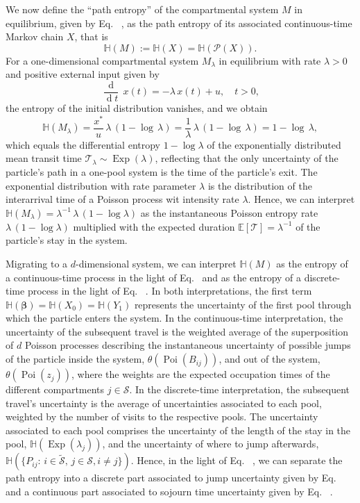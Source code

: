 \documentclass[smallextended]{svjour3}
\makeatletter
\renewcommand*{\eqref}[1]{%
  \hyperref[{#1}]{\textup{\tagform@{\ref*{#1}}}}%
}
\renewcommand{\vec}[1]{\mathbf{#1}}
\newcommand{\E}{\mathbb{E}}
\newcommand{\TT}{\mathcal{T}}
\renewcommand{\H}{\mathbb{H}}
\newcommand{\Exp}{\operatorname{Exp}}
\newcommand{\Poi}{\operatorname{Poi}}
\newcommand{\deriv}[1]{\frac{\operatorname{d}}{\operatorname{d}#1}}
\newcommand{\ie}{that is}
\renewcommand{\emph}[1]{``#1''}
\makeatother
\begin{document}
We now define the \emph{path entropy} of the compartmental system $M$ in equilibrium, given by Eq.~\eqref{eqn:lin_CS_sys}, as the path entropy of its associated continuous-time Markov chain $X$, \ie
\begin{equation}
  \H(M):=\H(X)=\H(\mathcal{P}(X)).
\end{equation}
For a one-dimensional compartmental system $M_\lambda$ in equilibrium with rate $\lambda>0$ and positive external input given by
\begin{equation}
  \deriv{t}\,x(t) = -\lambda\,x(t) + u,\quad t>0,
\end{equation}
the entropy of the initial distribution vanishes, and we obtain
\begin{equation}
  \H(M_\lambda) = \frac{x^\ast}{u}\,\lambda\,(1-\log\,\lambda) = \frac{1}{\lambda}\,\lambda\,(1-\log\,\lambda) = 1-\log\,\lambda,
\end{equation}  
which equals the differential entropy $1-\log\lambda$ of the exponentially distributed mean transit time $\TT_\lambda\sim\Exp(\lambda)$, reflecting that the only uncertainty of the particle's path in a one-pool system is the time of the particle's exit.
The exponential distribution with rate parameter $\lambda$ is the distribution of the interarrival time of a Poisson process wit intensity rate $\lambda$.
Hence, we can interpret $\H(M_\lambda) = \lambda^{-1}\,\lambda\,(1-\log\lambda)$ as the instantaneous Poisson entropy rate $\lambda\,(1-\log\lambda)$ multiplied with the expected duration $\E\left[\TT\right]=\lambda^{-1}$ of the particle's stay in the system.

Migrating to a $d$-dimensional system, we can interpret $\H(M)$ as the entropy of a continuous-time process in the light of Eq.~\eqref{eqn:H_occupation_time} and as the entropy of a discrete-time process in the light of Eq.~\eqref{eqn:H_number_of_visits}.
In both interpretations, the first term $\H(\vec{\beta})=\H(X_0)=\H(Y_1)$ represents the uncertainty of the first pool through which the particle enters the system.
In the continuous-time interpretation, the uncertainty of the subsequent travel is the weighted average of the superposition of $d$ Poisson processes describing the instantaneous uncertainty of possible jumps of the particle inside the system, $\theta(\Poi(B_{ij}))$, and out of the system, $\theta(\Poi(z_j))$, where the weights are the expected occupation times of the different compartments $j\in\mathcal{S}$. 
In the discrete-time interpretation, the subsequent travel's uncertainty is the average of uncertainties associated to each pool, weighted by the number of visits to the respective pools.
The uncertainty associated to each pool comprises the uncertainty of the length of the stay in the pool, $\H(\Exp(\lambda_j))$, and the uncertainty of where to jump afterwards, $\H(\{P_{ij}:\,i\in\widetilde{\mathcal{S}},\,j\in\mathcal{S},i\neq j\})$.
Hence, in the light of Eq.~\eqref{eqn:H_number_of_visits}, we can separate the path entropy into a discrete part associated to jump uncertainty given by Eq.~\eqref{eqn:H_discrete} and a continuous part associated to sojourn time uncertainty given by Eq.~\eqref{eqn:H_continuous}.
\end{document}
